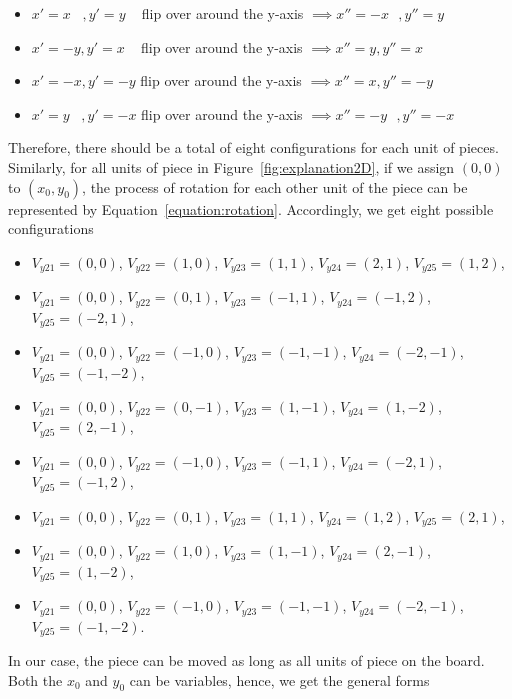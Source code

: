 \begin{itemize}
  \item  $x'=x\hspace{10pt}, y'=y\hspace{10pt}$    flip over around the y-axis $\implies x''=-x\hspace{8pt},y''=y$
  \item  $x'=-y, y'=x\hspace{10pt}$                flip over around the y-axis $\implies x''=y,y''=x$
  \item  $x'=-x, y'=-y$               flip over around the y-axis $\implies x''=x, y''=-y$
  \item  $x'=y\hspace{10pt},y'=-x$    flip over around the y-axis $\implies x''=-y\hspace{8pt}, y''=-x$
  \label{mirrorrotate4}
\end{itemize}
Therefore, there should be a total of eight configurations for each unit of pieces. Similarly, for all units of piece in Figure~\ref{fig:explanation2D}, if we assign $(0,0)$ to $(x_{0},y_{0})$, the process of rotation for each other unit of the piece can be represented by Equation~\ref{equation:rotation}. Accordingly, we get eight possible configurations
\begin{itemize}
 \item $V_{y21}=(0,0)$, $V_{y22}=(1,0)$, $V_{y23}=(1,1)$, $V_{y24}=(2,1)$, $V_{y25}=(1,2)$,
 \item $V_{y21}=(0,0)$, $V_{y22}=(0,1)$, $V_{y23}=(-1,1)$, $V_{y24}=(-1,2)$, $V_{y25}=(-2,1)$,
 \item $V_{y21}=(0,0)$, $V_{y22}=(-1,0)$, $V_{y23}=(-1,-1)$, $V_{y24}=(-2,-1)$, $V_{y25}=(-1,-2)$,
 \item $V_{y21}=(0,0)$, $V_{y22}=(0,-1)$, $V_{y23}=(1,-1)$, $V_{y24}=(1,-2)$, $V_{y25}=(2,-1)$,
 \item $V_{y21}=(0,0)$, $V_{y22}=(-1,0)$, $V_{y23}=(-1,1)$, $V_{y24}=(-2,1)$, $V_{y25}=(-1,2)$,
 \item $V_{y21}=(0,0)$, $V_{y22}=(0,1)$, $V_{y23}=(1,1)$, $V_{y24}=(1,2)$, $V_{y25}=(2,1)$,
 \item $V_{y21}=(0,0)$, $V_{y22}=(1,0)$, $V_{y23}=(1,-1)$, $V_{y24}=(2,-1)$, $V_{y25}=(1,-2)$,
 \item $V_{y21}=(0,0)$, $V_{y22}=(-1,0)$, $V_{y23}=(-1,-1)$, $V_{y24}=(-2,-1)$, $V_{y25}=(-1,-2)$.
\end{itemize}
In our case, the piece can be moved as long as all units of piece on the board. Both the $x_{0}$ and $y_{0}$ can be variables, hence, we get the general forms
